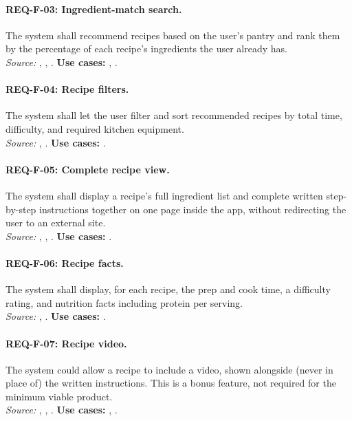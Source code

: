 \paragraph{REQ-F-03: Ingredient-match search.}
 The system shall recommend recipes based on the user's pantry and rank them by the percentage of each recipe's ingredients the user already has.\\
\textit{Source:} , , . \textbf{Use cases:} , .

\paragraph{REQ-F-04: Recipe filters.}
 The system shall let the user filter and sort recommended recipes by total time, difficulty, and required kitchen equipment.\\
\textit{Source:} , . \textbf{Use cases:} .

\paragraph{REQ-F-05: Complete recipe view.}
 The system shall display a recipe's full ingredient list and complete written step-by-step instructions together on one page inside the app, without redirecting the user to an external site.\\
\textit{Source:} , , . \textbf{Use cases:} .

\paragraph{REQ-F-06: Recipe facts.}
 The system shall display, for each recipe, the prep and cook time, a difficulty rating, and nutrition facts including protein per serving.\\
\textit{Source:} , . \textbf{Use cases:} .

\paragraph{REQ-F-07: Recipe video.}
 The system could allow a recipe to include a video, shown alongside (never in place of) the written instructions. This is a bonus feature, not required for the minimum viable product.\\
\textit{Source:} , , . \textbf{Use cases:} , .

